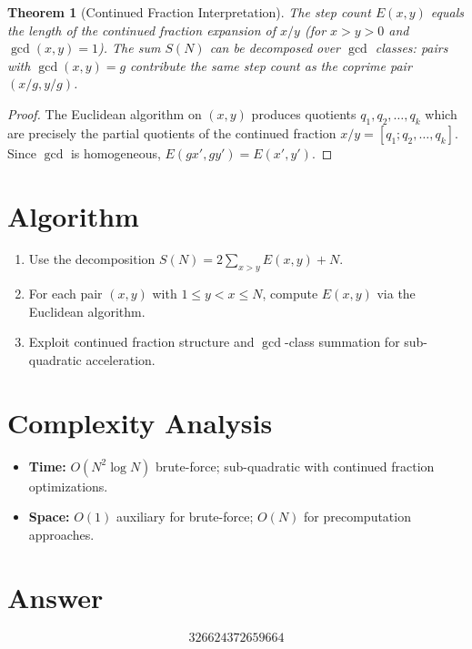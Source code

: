 \documentclass[11pt]{article}
\newtheorem{theorem}{Theorem}
\begin{document}
\begin{theorem}[Continued Fraction Interpretation]
The step count $E(x, y)$ equals the length of the continued fraction expansion of $x/y$ (for $x > y > 0$ and $\gcd(x,y) = 1$). The sum $S(N)$ can be decomposed over $\gcd$ classes: pairs with $\gcd(x,y) = g$ contribute the same step count as the coprime pair $(x/g, y/g)$.
\end{theorem}

\begin{proof}
The Euclidean algorithm on $(x, y)$ produces quotients $q_1, q_2, \ldots, q_k$ which are precisely the partial quotients of the continued fraction $x/y = [q_1; q_2, \ldots, q_k]$. Since $\gcd$ is homogeneous, $E(gx', gy') = E(x', y')$.
\end{proof}

\section{Algorithm}
\begin{enumerate}
    \item Use the decomposition $S(N) = 2\sum_{x>y} E(x,y) + N$.
    \item For each pair $(x, y)$ with $1 \leq y < x \leq N$, compute $E(x, y)$ via the Euclidean algorithm.
    \item Exploit continued fraction structure and $\gcd$-class summation for sub-quadratic acceleration.
\end{enumerate}

\section{Complexity Analysis}
\begin{itemize}
    \item \textbf{Time:} $O(N^2 \log N)$ brute-force; sub-quadratic with continued fraction optimizations.
    \item \textbf{Space:} $O(1)$ auxiliary for brute-force; $O(N)$ for precomputation approaches.
\end{itemize}

\section{Answer}

\[
\boxed{326624372659664}
\]
\end{document}
